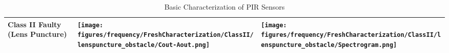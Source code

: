 \begin{table*}[htb]
\begin{tabular}{| p{2cm}| m{7cm} | m{7cm} | }
        \hline
        Class II Faulty (Lens Puncture) &         
        \begin{minipage}{.35\textwidth}
        \texttt{[image: figures/frequency/FreshCharacterization/ClassII/lenspuncture\_obstacle/Cout-Aout.png]}
        \end{minipage} & 
        \begin{minipage}{.35\textwidth}
        \texttt{[image: figures/frequency/FreshCharacterization/ClassII/lenspuncture\_obstacle/Spectrogram.png]}
        \end{minipage} \\ 
        \hline
        
    \end{tabular}
  \caption{Basic Characterization of PIR Sensors}
  \label{tbl:basic_char}
\end{table*}


